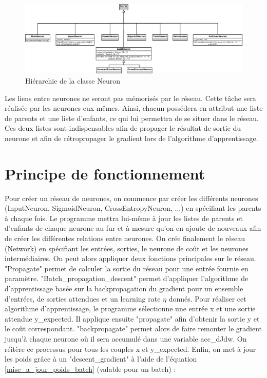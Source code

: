 \begin{figure}
\begin{center}
\includegraphics[scale=0.18]{images/uml_neurone_imp1.png}
\caption{Hiérarchie de la classe Neuron}
\label{uml_neurone_imp1}
\end{center}
\end{figure}


Les liens entre neurones ne seront pas mémorisés par le réseau. Cette tâche sera réalisée par les neurones eux-mêmes. Ainsi, chacun possédera en attribut une liste de parents et une liste d'enfants, ce qui lui permettra de se situer dans le réseau. Ces deux listes sont indispensables afin de propager le résultat de sortie du neurone et afin de rétropropager le gradient lors de l'algorithme d'apprentissage.
	
\section{Principe de fonctionnement}
Pour créer un réseau de neurones, on commence par créer les différents neurones (InputNeuron, SigmoidNeuron, CrossEntropyNeuron, ...) en spécifiant les parents à chaque fois. Le programme mettra lui-même à jour les listes de parents et d'enfants de chaque neurone au fur et à mesure qu'on en ajoute de nouveaux afin de créer les différentes relations entre neurones. On crée finalement le réseau (Network) en spécifiant les entrées, sorties, le neurone de coût et les neurones intermédiaires.
On peut alors appliquer deux fonctions principales sur le réseau. "Propagate" permet de calculer la sortie du réseau pour une entrée fournie en paramètre. "Batch\_propagation\_descent" permet d'appliquer l'algorithme de d'apprentissage basée sur la backpropagation du gradient pour un ensemble d'entrées, de sorties attendues et un learning rate $\eta$ donnés. 
Pour réaliser cet algorithme d'apprentissage, le programme sélectionne une entrée x et une sortie attendue y\_expected. Il applique ensuite "propagate" afin d'obtenir la sortie y et le coût correspondant. "backpropagate" permet alors de faire remonter le gradient jusqu'à chaque neurone où il sera accumulé dans une variable acc\_dJdw. On réitère ce processus pour tous les couples x et y\_expected. Enfin, on met à jour les poids grâce à un "descent\_gradient" à l'aide de l'équation \ref{mise_a_jour_poids_batch} (valable pour un batch) :

